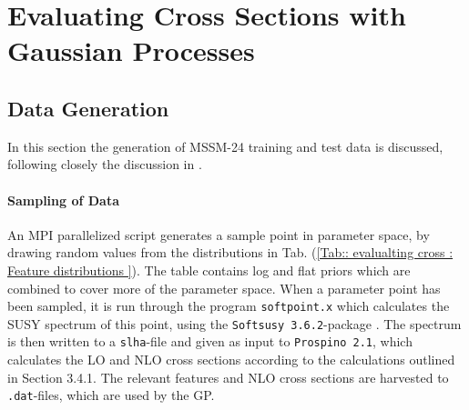 \documentclass[twoside,english]{uiofysmaster}
\begin{document}
\tableofcontents










\chapter{Evaluating Cross Sections with Gaussian Processes}

\section{Data Generation}

In this section the generation of MSSM-24 training and test data is discussed, following closely the discussion in \cite{sparre2018fast}. 

\subsubsection{Sampling of Data}

An MPI parallelized script generates a sample point in parameter space, by drawing random values from the distributions in Tab. (\ref{Tab:: evalualting cross : Feature distributions }). The table contains log and flat priors which are combined to cover more of the parameter space. When a parameter point has been sampled, it is run through the program \verb|softpoint.x| which calculates the SUSY spectrum of this point, using the \verb|Softsusy 3.6.2|-package \cite{ALLANACH2002305}. The spectrum is then written to a \verb|slha|-file and given as input to \verb|Prospino 2.1|, which calculates the LO and NLO cross sections according to the calculations outlined in Section 3.4.1. The relevant features and NLO cross sections are harvested to \verb|.dat|-files, which are used by the GP. 
\end{document}
